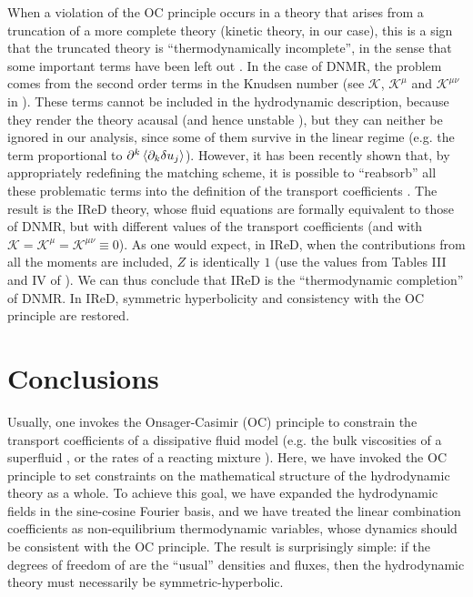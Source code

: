 \documentclass[a4paper, amsfonts, amssymb, amsmath, reprint, showkeys, nofootinbib, twoside, onecolumn,notitlepage]{revtex4-1}
\begin{document}
When a violation of the OC principle occurs in a theory that arises from a truncation of a more complete theory (kinetic theory, in our case), this is a sign that the truncated theory is ``thermodynamically incomplete'', in the sense that some important terms have been left out \cite{GeigenmullerOnsagerApproximate1983}. In the case of DNMR, the problem comes from the second order terms in the Knudsen number (see $\mathcal{K}$, $\mathcal{K}^\mu$ and $\mathcal{K}^{\mu \nu}$ in \cite{DMNR2012}). These terms cannot be included in the hydrodynamic description, because they render the theory acausal (and hence unstable \cite{GavassinoSuperluminal2021}), but they can neither be ignored in our analysis, since some of them survive in the linear regime (e.g. the term proportional to $\partial^k \braket{\partial_k \delta u_j}$). However, it has been recently shown that, by appropriately redefining the matching scheme, it is possible to ``reabsorb'' all these problematic terms into the definition of the transport coefficients \cite{Wagner2022}. The result is the IReD theory, whose fluid equations are formally equivalent to those of DNMR, but with different values of the transport coefficients (and with $\mathcal{K}=\mathcal{K}^\mu=\mathcal{K}^{\mu \nu} \equiv 0$). As one would expect, in IReD, when the contributions from all the moments are included, $Z$ is identically $1$ (use the values from Tables III and IV of \cite{Wagner2022}). We can thus conclude that IReD is the ``thermodynamic completion'' of DNMR. In IReD, symmetric hyperbolicity and consistency with the OC principle are restored.



\section{Conclusions}

Usually, one invokes the Onsager-Casimir (OC) principle to constrain the transport coefficients of a dissipative fluid model (e.g. the bulk viscosities of a superfluid \cite{landau6}, or the rates of a reacting mixture \cite{carter1991}). Here, we have invoked the OC principle to set constraints on the mathematical structure  of the hydrodynamic theory as a whole. To achieve this goal, we have expanded the hydrodynamic fields in the sine-cosine Fourier basis, and we have treated the linear combination coefficients as non-equilibrium thermodynamic variables, whose dynamics should be consistent with the OC principle. The result is surprisingly simple: if the degrees of freedom of are the ``usual'' densities and fluxes, then the hydrodynamic theory must necessarily be symmetric-hyperbolic.
\end{document}
